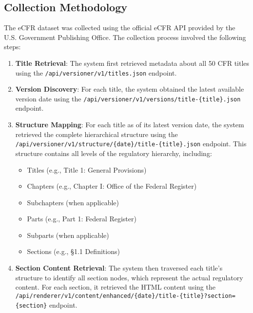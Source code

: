 \subsection{Collection Methodology}

The eCFR dataset was collected using the official eCFR API provided by the U.S. Government Publishing Office. The collection process involved the following steps:

\begin{enumerate}
  \item \textbf{Title Retrieval}: The system first retrieved metadata about all 50 CFR titles using the \verb|/api/versioner/v1/titles.json| endpoint.
  
  \item \textbf{Version Discovery}: For each title, the system obtained the latest available version date using the \verb|/api/versioner/v1/versions/title-{title}.json| endpoint.
  
  \item \textbf{Structure Mapping}: For each title as of its latest version date, the system retrieved the complete hierarchical structure using the \verb|/api/versioner/v1/structure/{date}/title-{title}.json| endpoint. This structure contains all levels of the regulatory hierarchy, including:
  \begin{itemize}
    \item Titles (e.g., Title 1: General Provisions)
    \item Chapters (e.g., Chapter I: Office of the Federal Register)
    \item Subchapters (when applicable)
    \item Parts (e.g., Part 1: Federal Register)
    \item Subparts (when applicable)
    \item Sections (e.g., §1.1 Definitions)
  \end{itemize}
  
  \item \textbf{Section Content Retrieval}: The system then traversed each title's structure to identify all section nodes, which represent the actual regulatory content. For each section, it retrieved the HTML content using the \verb|/api/renderer/v1/content/enhanced/{date}/title-{title}?section={section}| endpoint.
  

\end{enumerate}
